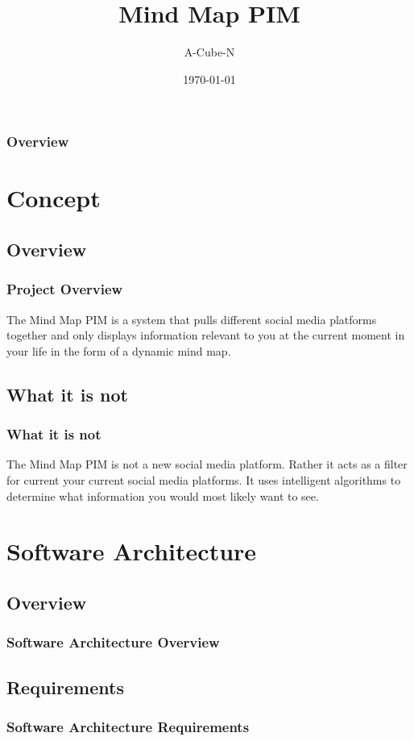 \documentclass{beamer}
\title[Mind Map PIM]{Mind Map PIM}
\author{A-Cube-N}
\institute[UP]{
	Department of Computer Science, University of Pretoria
}
\date{\today}
\begin{document}
\begin{frame}
	\titlepage
\end{frame}

\begin{frame}
	\frametitle{Overview}
	\tableofcontents
\end{frame}

\section{Concept}
	\subsection{Overview}
		\begin{frame}
		\frametitle{Project Overview}
		The Mind Map PIM is a system that pulls different social media platforms together and only displays information relevant to you at the current moment in your life in the form of a dynamic mind map.
		\end{frame}
	
	\subsection{What it is not}
		\begin{frame}
		\frametitle{What it is not}
		The Mind Map PIM is not a new social media platform. Rather it acts as a filter for current your current social media platforms. It uses intelligent algorithms to determine what information you would most likely want to see.
		\end{frame}
		
\section{Software Architecture}
	\subsection{Overview}
		\begin{frame}
		\frametitle{Software Architecture Overview}
		
		\end{frame}
		
	\subsection{Requirements}
		\begin{frame}
		\frametitle{Software Architecture Requirements}
		
		\end{frame}
		
\end{document}
